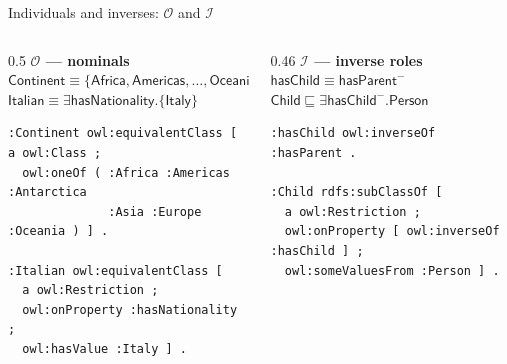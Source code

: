 \documentclass[10pt,aspectratio=169,xcolor=table]{beamer}
\newcommand{\dl}[1]{\ensuremath{\mathcal{#1}}}
\newcommand{\cn}[1]{\mathsf{#1}}
\newcommand{\rn}[1]{\mathsf{#1}}
\newcommand{\ind}[1]{\mathsf{#1}}
\newcommand{\sub}{\sqsubseteq}
\newcommand{\eqv}{\equiv}
\newcommand{\inv}[1]{#1^{-}}
\begin{document}
\begin{frame}[fragile]{Individuals and inverses: \dl{O} and \dl{I}}
  \begin{columns}[T]
    \begin{column}{0.5\textwidth}
      \textbf{\dl{O} --- nominals}\\[2pt]
      \footnotesize
      $\cn{Continent} \eqv \{\ind{Africa}, \ind{Americas}, \dots, \ind{Oceania}\}$\\
      $\cn{Italian} \eqv \exists \rn{hasNationality}.\{\ind{Italy}\}$
\begin{lstlisting}
:Continent owl:equivalentClass [ a owl:Class ;
  owl:oneOf ( :Africa :Americas :Antarctica
              :Asia :Europe :Oceania ) ] .

:Italian owl:equivalentClass [
  a owl:Restriction ;
  owl:onProperty :hasNationality ;
  owl:hasValue :Italy ] .
\end{lstlisting}
    \end{column}
    \begin{column}{0.46\textwidth}
      \textbf{\dl{I} --- inverse roles}\\[2pt]
      \footnotesize
      $\rn{hasChild} \eqv \inv{\rn{hasParent}}$\\
      $\cn{Child} \sub \exists \inv{\rn{hasChild}}.\cn{Person}$
\begin{lstlisting}
:hasChild owl:inverseOf :hasParent .

:Child rdfs:subClassOf [
  a owl:Restriction ;
  owl:onProperty [ owl:inverseOf :hasChild ] ;
  owl:someValuesFrom :Person ] .
\end{lstlisting}
    \end{column}
  \end{columns}
\end{frame}
\end{document}
